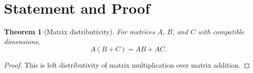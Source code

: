 \documentclass[11pt]{article}
\newtheorem{theorem}{Theorem}
\begin{document}
\section*{Statement and Proof}

\begin{theorem}[Matrix distributivity]
For matrices $A$, $B$, and $C$ with compatible dimensions,
\[
  A(B+C) = AB + AC.
\]
\end{theorem}

\begin{proof}
This is left distributivity of matrix multiplication over matrix addition.
\end{proof}
\end{document}
